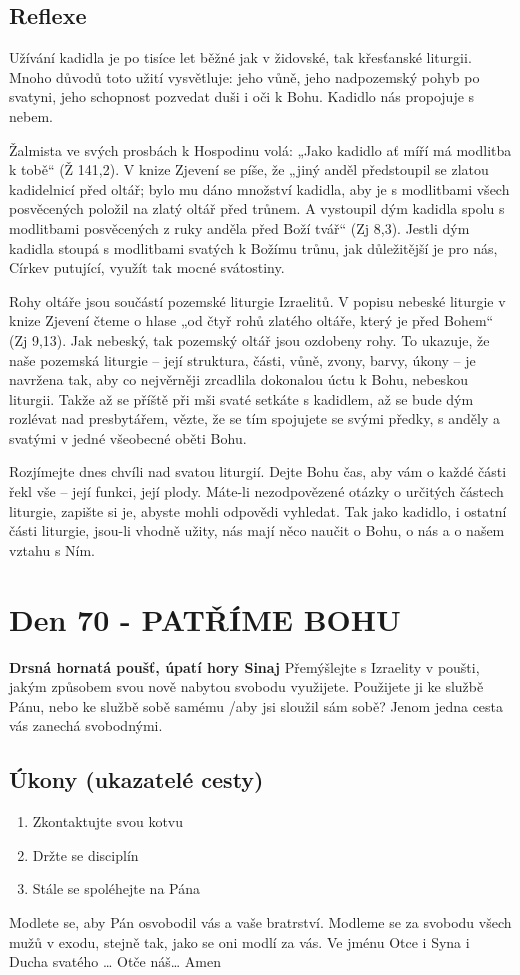 \documentclass[11pt]{article}
\newcommand{\zacatekDesatyTyden}{
\textbf{Drsná hornatá poušť, úpatí hory Sinaj} \newline 
Přemýšlejte s Izraelity v poušti, jakým způsobem svou nově nabytou svobodu využijete. Použijete ji ke službě Pánu, nebo ke službě sobě samému /aby jsi sloužil sám sobě? Jenom jedna cesta vás zanechá svobodnými.

\subsection*{Úkony (ukazatelé cesty)}
\begin{enumerate}
  \item Zkontaktujte svou kotvu
  \item Držte se disciplín
  \item Stále se spoléhejte na Pána
\end{enumerate}
Modlete se, aby Pán osvobodil vás a vaše bratrství. \newline
Modleme se za svobodu všech mužů v exodu, stejně tak, jako se oni modlí za vás.\newline
Ve jménu Otce i Syna i Ducha svatého …  Otče náš… Amen
}
\begin{document}
\subsection*{Reflexe}
Užívání kadidla je po tisíce let běžné jak v židovské, tak křesťanské liturgii. Mnoho důvodů toto užití vysvětluje: jeho
vůně, jeho nadpozemský pohyb po svatyni, jeho schopnost pozvedat duši i oči k Bohu. Kadidlo nás propojuje s nebem.

Žalmista ve svých prosbách k Hospodinu volá: „Jako kadidlo ať míří má modlitba k tobě“ (Ž 141,2). V knize Zjevení
se píše, že „jiný anděl předstoupil se zlatou kadidelnicí před oltář; bylo mu dáno množství kadidla, aby je s modlitbami
všech posvěcených položil na zlatý oltář před trůnem. A vystoupil dým kadidla spolu s modlitbami posvěcených z ruky
anděla před Boží tvář“ (Zj 8,3). Jestli dým kadidla stoupá s modlitbami svatých k Božímu trůnu, jak důležitější je pro
nás, Církev putující, využít tak mocné svátostiny.

Rohy oltáře jsou součástí pozemské liturgie Izraelitů. V popisu nebeské liturgie v knize Zjevení čteme o hlase „od čtyř
rohů zlatého oltáře, který je před Bohem“ (Zj 9,13). Jak nebeský, tak pozemský oltář jsou ozdobeny rohy. To ukazuje,
že naše pozemská liturgie – její struktura, části, vůně, zvony, barvy, úkony – je navržena tak, aby co nejvěrněji
zrcadlila dokonalou úctu k Bohu, nebeskou liturgii. Takže až se příště při mši svaté setkáte s kadidlem, až se bude dým
rozlévat nad presbytářem, vězte, že se tím spojujete se svými předky, s anděly a svatými v jedné všeobecné oběti Bohu.

Rozjímejte dnes chvíli nad svatou liturgií. Dejte Bohu čas, aby vám o každé části řekl vše – její funkci, její plody.
Máte-li nezodpovězené otázky o určitých částech liturgie, zapište si je, abyste mohli odpovědi vyhledat. Tak jako
kadidlo, i ostatní části liturgie, jsou-li vhodně užity, nás mají něco naučit o Bohu, o nás a o našem vztahu s Ním.





\newpage
\section{Den 70 - PATŘÍME BOHU}
\zacatekDesatyTyden
\end{document}
